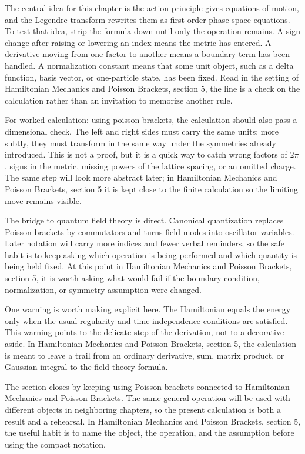 The central idea for this chapter is the action principle gives equations of motion, and the Legendre transform rewrites them as first-order phase-space equations.  To test that idea, strip the formula down until only the operation remains.  A sign change after raising or lowering an index means the metric has entered.  A derivative moving from one factor to another means a boundary term has been handled.  A normalization constant means that some unit object, such as a delta function, basis vector, or one-particle state, has been fixed.  Read in the setting of Hamiltonian Mechanics and Poisson Brackets, section 5, the line is a check on the calculation rather than an invitation to memorize another rule.

For worked calculation: using poisson brackets, the calculation should also pass a dimensional check.  The left and right sides must carry the same units; more subtly, they must transform in the same way under the symmetries already introduced.  This is not a proof, but it is a quick way to catch wrong factors of \(2\pi\), signs in the metric, missing powers of the lattice spacing, or an omitted charge.  The same step will look more abstract later; in Hamiltonian Mechanics and Poisson Brackets, section 5 it is kept close to the finite calculation so the limiting move remains visible.

The bridge to quantum field theory is direct.  Canonical quantization replaces Poisson brackets by commutators and turns field modes into oscillator variables.  Later notation will carry more indices and fewer verbal reminders, so the safe habit is to keep asking which operation is being performed and which quantity is being held fixed.  At this point in Hamiltonian Mechanics and Poisson Brackets, section 5, it is worth asking what would fail if the boundary condition, normalization, or symmetry assumption were changed.

One warning is worth making explicit here.  The Hamiltonian equals the energy only when the usual regularity and time-independence conditions are satisfied.  This warning points to the delicate step of the derivation, not to a decorative aside.  In Hamiltonian Mechanics and Poisson Brackets, section 5, the calculation is meant to leave a trail from an ordinary derivative, sum, matrix product, or Gaussian integral to the field-theory formula.

The section closes by keeping using Poisson brackets connected to Hamiltonian Mechanics and Poisson Brackets.  The same general operation will be used with different objects in neighboring chapters, so the present calculation is both a result and a rehearsal.  In Hamiltonian Mechanics and Poisson Brackets, section 5, the useful habit is to name the object, the operation, and the assumption before using the compact notation.



